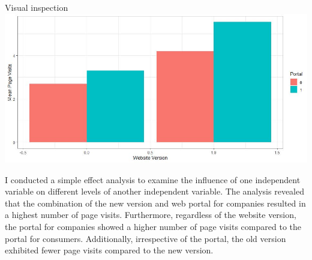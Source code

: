 \documentclass[
  ignorenonframetext,
]{beamer}
\begin{document}
\begin{frame}[fragile]{Visual inspection}
\includegraphics{visual_inspection_2.jpg}

I conducted a simple effect analysis to examine the influence of one
independent variable on different levels of another independent
variable. The analysis revealed that the combination of the new version
and web portal for companies resulted in a highest number of page
visits. Furthermore, regardless of the website version, the portal for
companies showed a higher number of page visits compared to the portal
for consumers. Additionally, irrespective of the portal, the old version
exhibited fewer page visits compared to the new version.
\end{frame}
\end{document}
